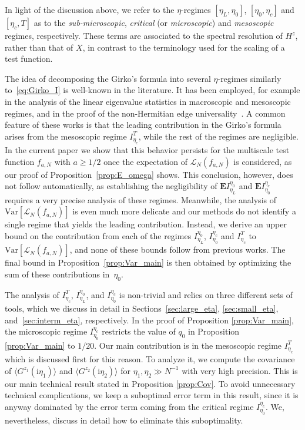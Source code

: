 \documentclass[10pt]{amsart}
\numberwithin{equation}{section}
\newcommand{\E}{\mathbf{E}}
\newcommand{\Var}{\mathrm{Var}}
\newcommand{\Lin}{\mathcal{L}}
\newcommand{\ii}{\mathrm{i}}
\begin{document}
In light of the discussion above, we refer to the $\eta$-regimes $[\eta_L,\eta_0]$, $[\eta_0,\eta_c]$ and $[\eta_c,T]$ as to the \emph{sub-microscopic}, \emph{critical} (or \emph{microscopic}) and \emph{mesoscopic} regimes, respectively. These terms are associated to the spectral resolution of $H^z$, rather than that of $X$, in contrast to the terminology used for the scaling of a test function. 

The idea of decomposing the Girko's formula into several $\eta$-regimes similarly to~\eqref{eq:Girko_I} is well-known in the literature. It has been employed, for example in the analysis of the linear eigenvalue statistics in macroscopic \cite{macroCLT_complex, macroCLT_real} and mesoscopic \cite{Cipolloni_meso} regimes, and in the proof of the non-Hermitian edge universality~\cite{nonherm_edge_univ}. A common feature of these works is that the leading contribution in the Girko's formula arises from the mesoscopic regime $I_{\eta_c}^T$, while the rest of the regimes are negligible. In the current paper we show that this behavior persists for the multiscale test function $f_{a,N}$ with $a\ge 1/2$ once the expectation of $\Lin_N(f_{a,N})$ is considered, as our proof of Proposition~\ref{prop:E_omega} shows. This conclusion, however, does not follow automatically, as establishing the negligibility of $\E I_{\eta_L}^{\eta_0}$ and $\E I_{\eta_0}^{\eta_c}$ requires a very precise analysis of these regimes.  Meanwhile, the analysis of $\Var\left[\Lin_N(f_{a,N})\right]$ is even much more delicate and our methods do not identify a single regime that yields the leading contribution. Instead, we derive an upper bound on the contribution from each of the regimes $I_{\eta_L}^{\eta_0}$, $I_{\eta_0}^{\eta_c}$ and $I_{\eta_c}^T$ to $\Var\left[\Lin_N(f_{a,N})\right]$, and none of these bounds follow from previous works. The final bound in Proposition~\ref{prop:Var_main} is then obtained by optimizing the sum of these contributions in~$\eta_0$. 

The analysis of $I_{\eta_c}^T$, $I_{\eta_L}^{\eta_0}$, and $I_{\eta_0}^{\eta_c}$ is non-trivial and relies on three different sets of tools, which we discuss in detail in Sections~\ref{sec:large_eta}, \ref{sec:small_eta}, and~\ref{sec:interm_eta}, respectively. In the proof of Proposition \ref{prop:Var_main}, the microscopic regime $I_{\eta_0}^{\eta_c}$ restricts the value of $q_0$ in Proposition \ref{prop:Var_main} to $1/20$. Our main contribution is in the mesoscopic regime $I_{\eta_c}^T$ which is discussed first for this reason. To analyze it, we compute the covariance of $\langle G^{z_1}(\ii\eta_1)\rangle$ and $\langle G^{z_2}(\ii\eta_2)\rangle$ for $\eta_1,\eta_2\gg N^{-1}$ with very high precision. This is our main technical result stated in Proposition \ref{prop:Cov}. To avoid unnecessary technical complications, we keep a suboptimal error term in this result, since it is anyway dominated by the error term coming from the critical regime $I_{\eta_0}^{\eta_c}$. We, nevertheless, discuss in detail how to eliminate this suboptimality.
\end{document}
